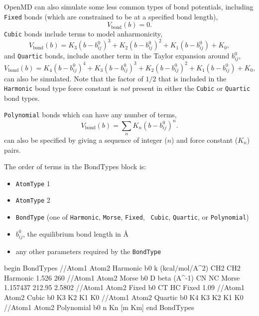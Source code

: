 \documentclass[]{book}
\begin{document}
OpenMD can also simulate some less common types of bond potentials,
including {\tt Fixed} bonds (which are constrained to be at a
specified bond length),
\begin{equation}
V_{\text{bond}}(b) = 0.
\end{equation}
{\tt Cubic} bonds include terms to model anharmonicity,
\begin{equation}
V_{\text{bond}}(b) =  K_3 (b -  b_{ij}^0)^3 + K_2 (b - b_{ij}^0)^2 + K_1 (b -  b_{ij}^0) + K_0,
\end{equation}
and {\tt Quartic} bonds, include another term in the Taylor
expansion around $b_{ij}^0$,
\begin{equation}
V_{\text{bond}}(b) = K_4 (b -  b_{ij}^0)^4 +  K_3 (b -  b_{ij}^0)^3 +
K_2 (b - b_{ij}^0)^2 + K_1 (b -  b_{ij}^0) + K_0,
\end{equation}
can also be simulated.  Note that the factor of $1/2$ that is included
in the {\tt Harmonic} bond type force constant is {\it not} present in
either the {\tt Cubic} or {\tt Quartic} bond types.

{\tt Polynomial} bonds which can have any number of terms,
\begin{equation}
V_{\text{bond}}(b) = \sum_n K_n (b -  b_{ij}^0)^n.
\end{equation}
can also be specified by giving a sequence of integer ($n$) and force
constant ($K_n$) pairs.

The order of terms in the BondTypes block is:
\begin{itemize}
\item {\tt AtomType} 1
\item {\tt AtomType} 2
\item {\tt BondType} (one of {\tt Harmonic}, {\tt Morse}, {\tt Fixed}, {\tt
        Cubic}, {\tt Quartic}, or {\tt Polynomial})
\item $b_{ij}^0$, the equilibrium bond length in \AA
\item any other parameters required by the {\tt BondType}
\end{itemize}

\begin{code}[caption={[An example of a BondTypes block.] A
simple example of a BondTypes block.  Distances ($b_0$)
are given in \AA\ and force constants are given in
units so that when multiplied by the correct power of distance they
return energies in kcal/mol.  For example $k$ for a Harmonic bond is
in units of kcal/mol/\AA$^2$.},
label={sch:BondTypes}]
begin BondTypes
//Atom1 Atom2   Harmonic        b0        k (kcal/mol/A^2)
CH2     CH2     Harmonic        1.526     260
//Atom1 Atom2   Morse           b0        D       beta (A^-1)
CN      NC      Morse           1.157437  212.95  2.5802
//Atom1 Atom2   Fixed           b0
CT      HC      Fixed           1.09
//Atom1 Atom2   Cubic           b0        K3      K2      K1      K0
//Atom1 Atom2   Quartic         b0        K4      K3      K2      K1      K0
//Atom1 Atom2   Polynomial      b0        n       Kn      [m      Km]
end BondTypes
\end{code}
\end{document}

